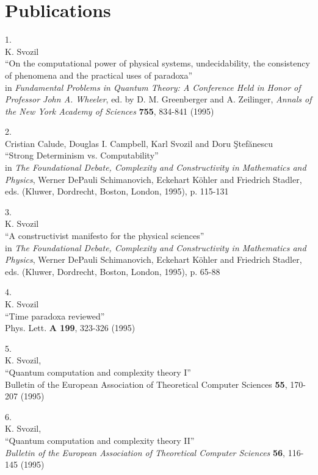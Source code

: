 

\section{Publications}

1.\\
 K. Svozil\\
``On the computational power of physical systems,
undecidability, the consistency of phenomena and
 the practical uses of paradoxa''\\
in {\sl Fundamental Problems in
Quantum Theory: A Conference Held in Honor of Professor John A.
Wheeler}, ed. by D. M. Greenberger and A. Zeilinger,  {\sl Annals of the
New York Academy of Sciences} {\bf 755}, 834-841 (1995)


2.\\
Cristian Calude,
Douglas I. Campbell,
 Karl Svozil and
Doru \c{S}tef\u anescu \\
``Strong Determinism vs.  Computability''\\
in {\it The Foundational Debate, Complexity and Constructivity in
Mathematics and Physics}, Werner DePauli Schimanovich, Eckehart K\"ohler
and Friedrich Stadler, eds. (Kluwer, Dordrecht, Boston, London, 1995),
p. 115-131


3.\\
 K. Svozil\\
``A constructivist manifesto for the physical  sciences''\\
 in
{\it The Foundational Debate, Complexity and Constructivity in
Mathematics and Physics}, Werner DePauli Schimanovich, Eckehart K\"ohler
and Friedrich Stadler, eds. (Kluwer, Dordrecht, Boston, London, 1995),
p. 65-88

4.\\
K. Svozil\\
``Time paradoxa reviewed''\\
 Phys. Lett. {\bf A 199}, 323-326 (1995)


5.\\
 K. Svozil, \\
``Quantum computation and complexity theory I''\\
 Bulletin of the European Association of Theoretical Computer
Sciences {\bf 55}, 170-207 (1995)

6.\\
K. Svozil,\\
``Quantum computation and complexity theory II''\\
{\sl Bulletin of the European Association of Theoretical Computer
Sciences} {\bf 56}, 116-145 (1995)

